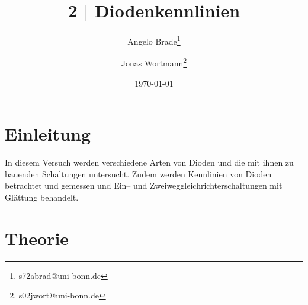 \documentclass[a4paper,10pt]{article}
\numberwithin{equation}{section}
\begin{document}
\begin{titlepage}
        \title{2 $|$ Diodenkennlinien}
        \author[1]{Angelo Brade\thanks{s72abrad@uni-bonn.de}}
        \author[1]{Jonas Wortmann\thanks{s02jwort@uni-bonn.de}}
        \date{\today}
\end{titlepage}

\maketitle
{}


\newpage


\fancyhead[R]{\thepage}
\fancyfoot[C]{}

\tableofcontents


\newpage


\fancyhead[L]{\leftmark}

\section{Einleitung}
In diesem Versuch werden verschiedene Arten von Dioden und die mit ihnen zu bauenden Schaltungen untersucht.
Zudem werden Kennlinien von Dioden betrachtet und gemessen und Ein-- und Zweiweggleichrichterschaltungen mit Glättung behandelt.

\newpage
\section{Theorie}
\end{document}
